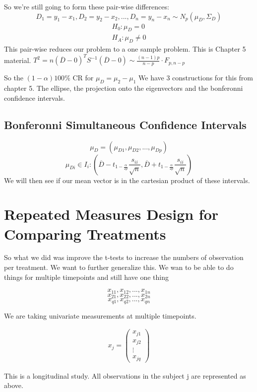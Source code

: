 So we're still going to form these pair-wise differences:
\[D_1 = y_1-x_1, D_2 = y_2-x_2,...,D_n = y_n-x_n \sim N_p(\mu_D,\Sigma_D)\]
\begin{gather*}
    H_0: \mu_D = 0\\
    H_A:\mu_D \neq 0
\end{gather*}
This pair-wise reduces our problem to a one sample problem. This is Chapter 5 material.
$T^2 = n(\overline{D}-0)^TS^{-1}(\overline{D}-0)\sim \frac{(n-1)p}{n-p}\cdot F_{p,n-p}$

So the $(1-\alpha)100\%$ CR for $\mu_D=\mu_2-\mu_1$ We have 3 constructions for this from chapter 5. The ellipse, the projection onto the eigenvectors and the bonferonni confidence intervals.

\subsection{Bonferonni Simultaneous Confidence Intervals}

\[\mu_D = (\mu_{D1}, \mu_{D2}, ..., \mu_{Dp})\]
\[\mu_{Di}\in I_i: (\overline{D}-t_{1-\frac{\alpha}{2p}}\frac{s_{ii}}{\sqrt{n}},\overline{D}+t_{1-\frac{\alpha}{2p}}\frac{s_{ii}}{\sqrt{n}})\]
We will then see if our mean vector is in the cartesian product of these intervals.

\section{Repeated Measures Design for Comparing Treatments}
So what we did was improve the t-tests to increase the numbers of observation per treatment. We want to further generalize this. We wan to be able to do things for multiple timepoints and still have one thing

\[x_{11},x_{12},...,x_{1n}\]
\[x_{21},x_{22},...,x_{2n}\]
\[x_{q1},x_{q2},...,x_{qn}\]

We are taking univariate measurements at multiple timepoints.

\begin{gather*}
    x_j = \begin{pmatrix}
    x_{j1}\\
    x_{j2}\\
    \vdots
    \\
    x_{jq}
    \end{pmatrix}
\end{gather*}

This is a longitudinal study. All observations in the subject j are represented as above.

